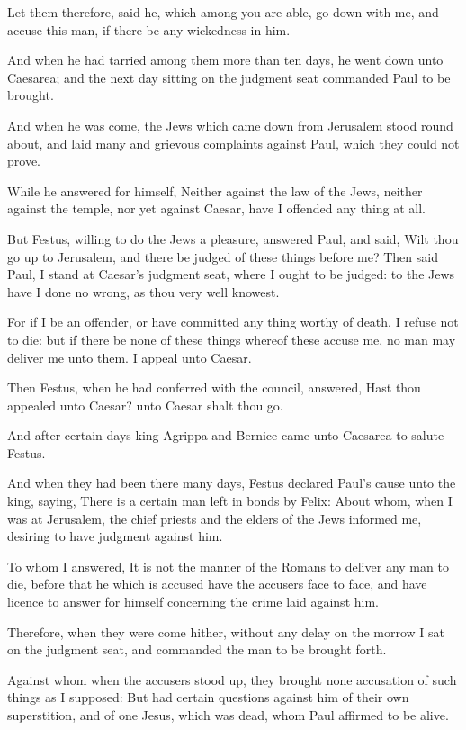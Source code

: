 \verse Let them therefore, said he, which among you are able, go down with me, and accuse this man, if there be any wickedness in him.

\verse And when he had tarried among them more than ten days, he went down unto Caesarea; and the next day sitting on the judgment seat commanded Paul to be brought.

\verse And when he was come, the Jews which came down from Jerusalem stood round about, and laid many and grievous complaints against Paul, which they could not prove.

\verse While he answered for himself, Neither against the law of the Jews, neither against the temple, nor yet against Caesar, have I offended any thing at all.

\verse But Festus, willing to do the Jews a pleasure, answered Paul, and said, Wilt thou go up to Jerusalem, and there be judged of these things before me?  \verse Then said Paul, I stand at Caesar's judgment seat, where I ought to be judged: to the Jews have I done no wrong, as thou very well knowest.

\verse For if I be an offender, or have committed any thing worthy of death, I refuse not to die: but if there be none of these things whereof these accuse me, no man may deliver me unto them. I appeal unto Caesar.

\verse Then Festus, when he had conferred with the council, answered, Hast thou appealed unto Caesar? unto Caesar shalt thou go.

\verse And after certain days king Agrippa and Bernice came unto Caesarea to salute Festus.

\verse And when they had been there many days, Festus declared Paul's cause unto the king, saying, There is a certain man left in bonds by Felix: \verse About whom, when I was at Jerusalem, the chief priests and the elders of the Jews informed me, desiring to have judgment against him.

\verse To whom I answered, It is not the manner of the Romans to deliver any man to die, before that he which is accused have the accusers face to face, and have licence to answer for himself concerning the crime laid against him.

\verse Therefore, when they were come hither, without any delay on the morrow I sat on the judgment seat, and commanded the man to be brought forth.

\verse Against whom when the accusers stood up, they brought none accusation of such things as I supposed: \verse But had certain questions against him of their own superstition, and of one Jesus, which was dead, whom Paul affirmed to be alive.


